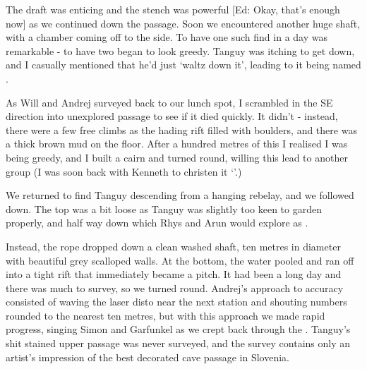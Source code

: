The draft was enticing and the stench was powerful [Ed: Okay, that's enough now] as we continued down the passage. Soon we encountered another huge shaft, with a chamber coming off to the side. To have one such find in a day was remarkable - to have two began to look greedy. Tanguy was itching to get down, and I casually mentioned that he'd just `waltz down it', leading to it being named .

 
As Will and Andrej surveyed back to our lunch spot, I scrambled in the SE direction into unexplored passage to see if it died quickly. It didn't - instead, there were a few free climbs as the hading rift filled with boulders, and there was a thick brown mud on the floor. After a hundred metres of this I realised I was being greedy, and I built a cairn and turned round, willing this lead to another group (I was soon back with Kenneth to christen it `'.)
 
We returned to find Tanguy descending from a hanging rebelay, and we followed down. The top was a bit loose as Tanguy was slightly too keen to garden properly, and half way down  which Rhys and Arun would explore as .
 
Instead, the rope dropped down a clean washed shaft, ten metres in diameter with beautiful grey scalloped walls. At the bottom, the water pooled and ran off into a tight rift that immediately became a pitch. It had been a long day and there was much to survey, so we turned round. Andrej's approach to accuracy consisted of waving the laser disto near the next station and shouting numbers rounded to the nearest ten metres, but with this approach we made rapid progress, singing Simon and Garfunkel as we crept back through the . Tanguy's shit stained upper passage was never surveyed, and the survey contains only an artist's impression of the best decorated cave passage in Slovenia.




